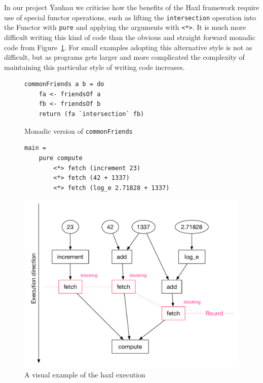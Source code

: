 In our project Ÿauhau we criticise how the benefits of the Haxl framework require use of special functor operations, such as lifting the \texttt{intersection} operation into the Functor with \texttt{pure} and applying the arguments with \texttt{<*>}.
It is much more difficult writing this kind of code than the obvious and straight forward monadic code from Figure~\ref{fig:monadic-common-friends}.
For small examples adopting this alternative style is not as difficult, but as programs gets larger and more complicated the complexity of maintaining this particular style of writing code increases.

\begin{figure}[h]
\begin{verbatim}
commonFriends a b = do
    fa <- friendsOf a
    fb <- friendsOf b
    return (fa `intersection` fb)
\end{verbatim}
\caption{Monadic version of \texttt{commonFriends}}
\label{fig:monadic-common-friends}
\end{figure}

\begin{figure}
\begin{verbatim}
main =
    pure compute
        <*> fetch (increment 23)
        <*> fetch (42 + 1337)
        <*> fetch (log_e 2.71828 + 1337)
\end{verbatim}
    \includegraphics[width=\linewidth]{../Figures/haxl-basic-example}
    \caption{A visual example of the haxl execution}
    \label{fig:haxl-basic-example}
\end{figure}

